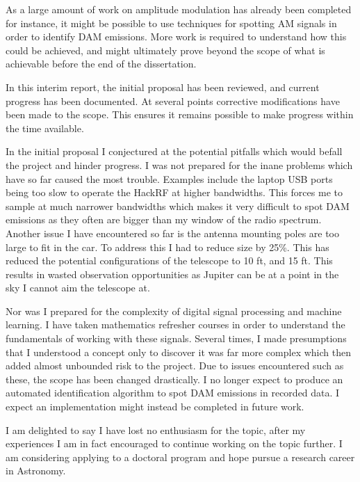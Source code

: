 \documentclass[runningheads,a4paper]{llncs}
\begin{document}
As a large amount of work on amplitude modulation has already been completed for instance, it might be possible to use techniques for spotting AM signals in order to identify \gls{DAM} emissions. More work is required to understand how this could be achieved, and might ultimately prove beyond the scope of what is achievable before the end of the dissertation.

In this interim report, the initial proposal has been reviewed, and current progress has been documented. At several points corrective modifications have been made to the scope. This ensures it remains possible to make progress within the time available. 

In the initial proposal I conjectured at the potential pitfalls which would befall the project and hinder progress. I was not prepared for the inane problems which have so far caused the most trouble. Examples include the laptop USB ports being too slow to operate the HackRF at higher bandwidths. This forces me to sample at much narrower bandwidths which makes it very difficult to spot \gls{DAM} emissions as they often are bigger than my window of the radio spectrum. Another issue I have encountered so far is the antenna mounting poles are too large to fit in the car. To address this I had to reduce size by 25\%. This has reduced the potential configurations of the telescope to 10 ft, and 15 ft. This results in wasted observation opportunities as Jupiter can be at a point in the sky I cannot aim the telescope at.

Nor was I prepared for the complexity of digital signal processing and machine learning. I have taken mathematics refresher courses in order to understand the fundamentals of working with these signals. Several times, I made presumptions that I understood a concept only to discover it was far more complex which then added almost unbounded risk to the project. Due to issues encountered such as these, the scope has been changed drastically. I no longer expect to produce an automated identification algorithm to spot \gls{DAM} emissions in recorded data. I expect an implementation might instead be completed in future work. 

I am delighted to say I have lost no enthusiasm for the topic, after my experiences I am in fact encouraged to continue working on the topic further. I am considering applying to a doctoral program and hope pursue a research career in Astronomy.


%
%
\newpage
\end{document}
